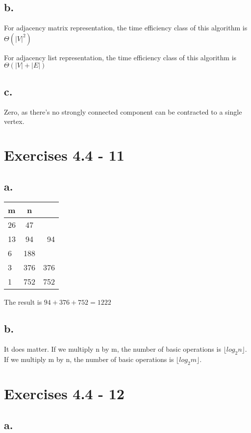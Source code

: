 \documentclass{article}
\begin{document}
\subsection*{b.}

For adjacency matrix representation, the time efficiency class of this algorithm is $\Theta(|V|^2)$

For adjacency list representation, the time efficiency class of this algorithm is $\Theta(|V|+|E|)$

\subsection*{c.}

Zero, as there's no strongly connected component can be contracted to a single vertex.

\section{Exercises 4.4 - 11}

\subsection*{a.}

\begin{tabular}{ |l| c| r| }
\hline
m&n&\\ \hline
26&47&\\ \hline
13&94&94\\\hline
6&188&\\\hline
3&376& 376\\\hline
1&752&752\\\hline
\end{tabular}

The result is $94+ 376+752 = 1222$

\subsection*{b.}

It does matter. If we multiply n by m, the number of basic operations is $\lfloor log_2n\rfloor$. If we multiply m by n, the number of basic operations is $\lfloor log_2m\rfloor$. 

\section{Exercises 4.4 - 12}

\subsection*{a.}
\end{document}
